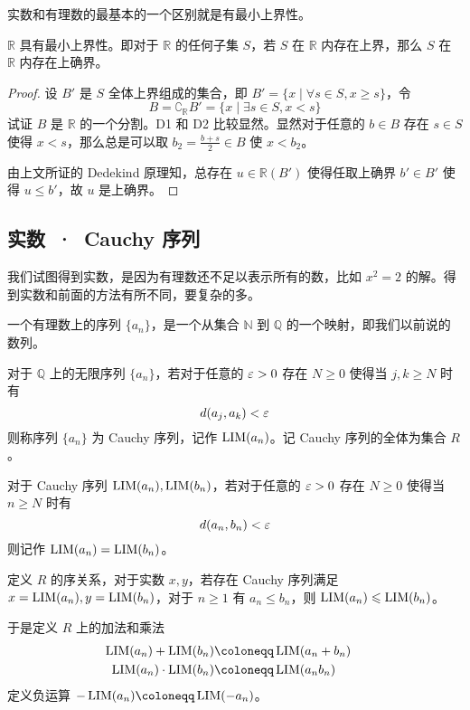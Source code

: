 实数和有理数的最基本的一个区别就是有最小上界性。

\begin{theorem}[确界原理]
	$\mathbb{R}$ 具有最小上界性。即对于 $\mathbb{R}$ 的任何子集 $S$，若 $S$ 在 $\mathbb{R}$ 内存在上界，那么 $S$ 在 $\mathbb{R}$ 内存在上确界。
\end{theorem}
\begin{proof}
	设 $B'$ 是 $S$ 全体上界组成的集合，即 $B' = \{x \mid\forall s \in S, x \geqslant s \}$，令
	\[ B = \complement_\mathbb{R} B' = \{ x \mid \exists s \in S, x < s\} \]
	试证 $B$ 是 $\mathbb{R}$ 的一个分割。D1 和 D2 比较显然。显然对于任意的 $b \in B$ 存在 $s \in S$ 使得 $x < s$，那么总是可以取 $b_2 = \frac{b+s}{2} \in B$ 使 $x < b_2$。

	由上文所证的 Dedekind 原理知，总存在 $u \in \mathbb{R}(B')$ 使得任取上确界 $b' \in B'$ 使得 $u \leqslant b'$，故 $u$ 是上确界。
\end{proof}

\subsection{实数\ ·\ Cauchy 序列}

我们试图得到实数，是因为有理数还不足以表示所有的数，比如 $x^2=2$ 的解。得到实数和前面的方法有所不同，要复杂的多。

一个有理数上的序列 $\{a_n\}$，是一个从集合 $\mathbb{N}$ 到 $\mathbb{Q}$ 的一个映射，即我们以前说的数列。

对于 $\mathbb{Q}$ 上的无限序列 $\{a_n\}$，若对于任意的 $\varepsilon > 0$ 存在 $N \geqslant 0$ 使得当 $j,k \geqslant N$ 时有
\[ d(a_j,a_k) < \varepsilon\]
则称序列 $\{a_n\}$ 为 Cauchy 序列，记作 $\operatorname{{LIM}}(a_n)$。记 Cauchy 序列的全体为集合 $R$。

对于 Cauchy 序列 $\operatorname{{LIM}}(a_n),\operatorname{{LIM}}(b_n)$，若对于任意的 $\varepsilon > 0$ 存在 $N \geqslant 0$ 使得当 $n \geqslant N$ 时有
\[ d(a_n,b_n) < \varepsilon\]
则记作 $\operatorname{{LIM}}(a_n) = \operatorname{{LIM}}(b_n)$。

定义 $R$ 的序关系，对于实数 $x,y$，若存在 Cauchy 序列满足 $x=\operatorname{{LIM}}(a_n),y=\operatorname{{LIM}}(b_n)$，对于 $n\geqslant 1$ 有 $a_n \leqslant b_n$，则 $\operatorname{{LIM}}(a_n) \leqslant \operatorname{{LIM}}(b_n)$。

于是定义 $R$ 上的加法和乘法
\[ \begin{aligned}
		\LIM(a_n) + \LIM(b_n)     & \coloneqq  \LIM(a_n+b_n) & \\
		\LIM(a_n) \cdot \LIM(b_n) & \coloneqq  \LIM(a_nb_n)    \\
	\end{aligned} \]
定义负运算 $-\LIM(a_n) \coloneqq  \LIM(-a_n)$。


